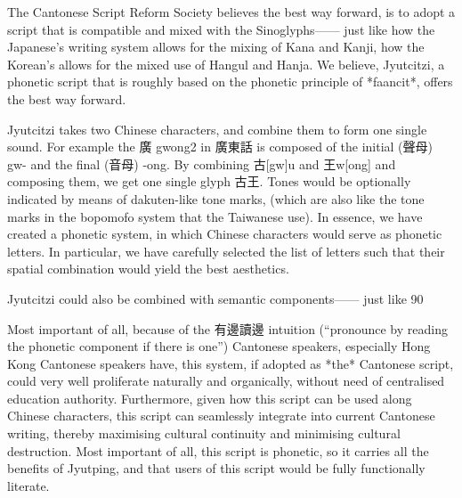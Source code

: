 The Cantonese Script Reform Society believes the best way forward, is to adopt a script that is compatible and mixed with the Sinoglyphs—— just like how the Japanese’s writing system allows for the mixing of Kana and Kanji, how the Korean’s allows for the mixed use of Hangul and Hanja. We believe, Jyutcitzi, a phonetic script that is roughly based on the phonetic principle of *faancit*, offers the best way forward.

Jyutcitzi takes two Chinese characters, and combine them to form one single sound. For example the 廣 gwong2 in 廣東話 is composed of the initial (聲母) gw- and the final (音母) -ong. By combining 古[gw]u and 王w[ong] and composing them, we get one single glyph 古王. Tones would be optionally indicated by means of dakuten-like tone marks, (which are also like the tone marks in the bopomofo system that the Taiwanese use). In essence, we have created a phonetic system, in which Chinese characters would serve as phonetic letters. In particular, we have carefully selected the list of letters such that their spatial combination would yield the best aesthetics.

Jyutcitzi could also be combined with semantic components—— just like 90%

Most important of all, because of the 有邊讀邊 intuition (“pronounce by reading the phonetic component if there is one”) Cantonese speakers, especially Hong Kong Cantonese speakers have, this system, if adopted as *the* Cantonese script, could very well proliferate naturally and organically, without need of centralised education authority. Furthermore, given how this script can be used along Chinese characters, this script can seamlessly integrate into current Cantonese writing, thereby maximising cultural continuity and minimising cultural destruction. Most important of all, this script is phonetic, so it carries all the benefits of Jyutping, and that users of this script would be fully functionally literate.

